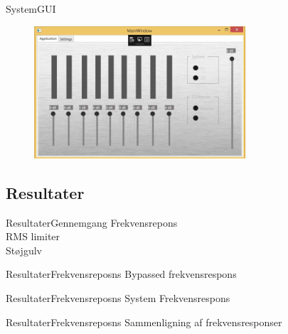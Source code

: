 \begin{frame}{System}{GUI}
\begin{figure}[H]
\centering
\includegraphics[width=0.7\textwidth]{GUIApp}
\end{figure}
\end{frame}

\subsection{Resultater}
\begin{frame}{Resultater}{Gennemgang}
Frekvensrepons \\
\vspace{5mm}
RMS limiter \\
\vspace{5mm}
Støjgulv \\
\end{frame}

\begin{frame}{Resultater}{Frekvensreposns}
Bypassed frekvensrespons
\begin{figure}[H]
	\centering
	
\end{figure}
\end{frame}


\begin{frame}{Resultater}{Frekvensreposns}
System Frekvensrespons
\begin{figure}[H]
	\centering
	
\end{figure}
\end{frame}

\begin{frame}{Resultater}{Frekvensreposns}
Sammenligning af frekvensresponser
\begin{figure}[H]
	\centering
	
\end{figure}
\end{frame}


